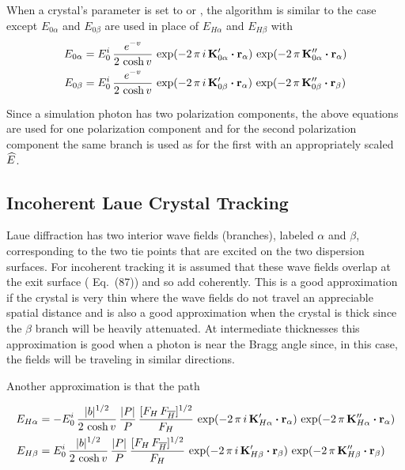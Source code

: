 When a crystal's  parameter is set to
 or , the algorithm is similar
to the  case except $E_{0\alpha}$ and
$E_{0\beta}$ are used in place of $E_{H\alpha}$ and
$E_{H\beta}$ with
\begin{align}
  E_{0\alpha} &= E_0^i \, \frac{\displaystyle e^{-v}}{\displaystyle 2 \, \cosh v} \, 
    \exp({-2 \, \pi \, i \, {\bf K}'_{0\alpha} \mathbin{\boldsymbol{\cdot}} {\bf r}_\alpha}) \,
    \exp({-2 \, \pi \, {\bf K}''_{0\alpha} \mathbin{\boldsymbol{\cdot}} {\bf r}_\alpha}) \nonumber \\
  E_{0\beta} &= E_0^i \, \frac{\displaystyle e^{-v}}{\displaystyle 2 \, \cosh v} \, 
    \exp({-2 \, \pi \, i \, {\bf K}'_{0\beta} \mathbin{\boldsymbol{\cdot}} {\bf r}_\alpha}) \,
    \exp({-2 \, \pi \, {\bf K}''_{0\beta} \mathbin{\boldsymbol{\cdot}} {\bf r}_\beta})
\end{align}

Since a simulation photon has two polarization components, the above
equations are used for one polarization component and for the second
polarization component the same branch is used as for the first with
an appropriately scaled $\widehat E$.

\subsection{Incoherent Laue Crystal Tracking}
\label{ss:incoherent.laue}

Laue diffraction has two interior wave fields (branches), labeled
$\alpha$ and $\beta$, corresponding to the two tie points that are
excited on the two dispersion surfaces. For incoherent tracking it is
assumed that these wave fields overlap at the exit surface
(\cite{b:batterman} Eq.~(87)) and so add coherently. This is a good
approximation if the crystal is very thin where the wave fields do not
travel an appreciable spatial distance and is also a good
approximation when the crystal is thick since the $\beta$ branch will
be heavily attenuated. At intermediate thicknesses this approximation
is good when a photon is near the Bragg angle since, in this case, the
fields will be traveling in similar directions.

Another approximation is that the path

\begin{align}
  E_{H\alpha} &= -E_0^i \, \frac{\displaystyle |b|^{1/2}}{\displaystyle 2 \, \cosh v} \, 
    \frac{|P|}{P} \, 
    \frac{[F_H \, F_{\overline{H}}]^{1/2}}{F_H} \, 
    \exp({-2 \, \pi \, i \, {\bf K}'_{H\alpha} \mathbin{\boldsymbol{\cdot}} {\bf r}_\alpha}) \,
    \exp({-2 \, \pi \, {\bf K}''_{H\alpha} \mathbin{\boldsymbol{\cdot}} {\bf r}_\alpha}) \nonumber \\
  E_{H\beta} &= E_0^i \, \frac{\displaystyle |b|^{1/2}}{\displaystyle 2 \, \cosh v} \, 
    \frac{|P|}{P} \, 
    \frac{[F_H \, F_{\overline{H}}]^{1/2}}{F_H} \, 
    \exp({-2 \, \pi \, i \, {\bf K}'_{H\beta} \mathbin{\boldsymbol{\cdot}} {\bf r}_\beta}) \,
    \exp({-2 \, \pi \, {\bf K}''_{H\beta} \mathbin{\boldsymbol{\cdot}} {\bf r}_\beta})
\end{align}


